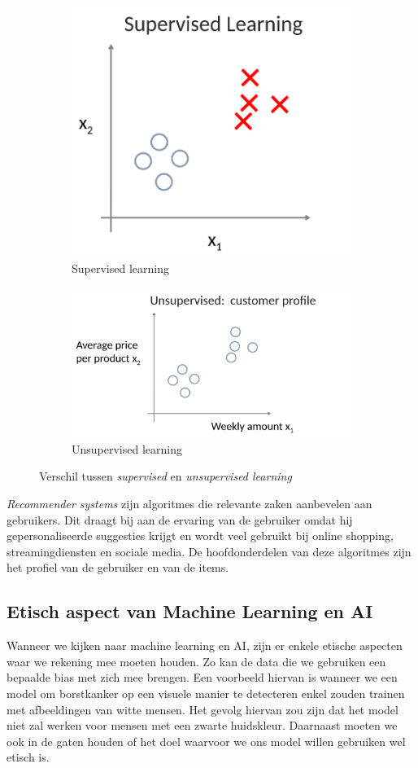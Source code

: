 \begin{figure}[h]
	\centering
	\begin{subfigure}{.5\textwidth}
		\centering
		\includegraphics[height=0.45\textwidth]{images/1-supervised-learning.png}
		\caption{Supervised learning}
		\label{fig:supervised-learning}
	\end{subfigure}%
	\begin{subfigure}{.5\textwidth}
		\centering
		\includegraphics[height=0.45\textwidth]{images/2-unsupervised-learning.png}
		\caption{Unsupervised learning}
		\label{fig:unsupervised-learning}
	\end{subfigure}
	\caption{Verschil tussen \textit{supervised} en \textit{unsupervised learning}}
	\label{fig:supervised-vs-unsupervised-learning}
\end{figure}

\noindent
\textit{Recommender systems} zijn algoritmes die relevante zaken aanbevelen aan gebruikers. Dit draagt bij aan de ervaring van de gebruiker omdat hij gepersonaliseerde suggesties krijgt en wordt veel gebruikt bij online shopping, streamingdiensten en sociale media. De hoofdonderdelen van deze algoritmes zijn het profiel van de gebruiker en van de items.

\subsection{Etisch aspect van Machine Learning en AI}

Wanneer we kijken naar machine learning en AI, zijn er enkele etische aspecten waar we rekening mee moeten houden. Zo kan de data die we gebruiken een bepaalde bias met zich mee brengen. Een voorbeeld hiervan is wanneer we een model om borstkanker op een visuele manier te detecteren enkel zouden trainen met afbeeldingen van witte mensen. Het gevolg hiervan zou zijn dat het model niet zal werken voor mensen met een zwarte huidskleur. Daarnaast moeten we ook in de gaten houden of het doel waarvoor we ons model willen gebruiken wel etisch is. 
\newpage
